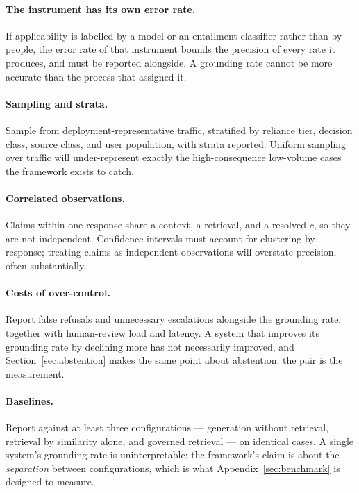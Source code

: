 \paragraph{The instrument has its own error rate.} If applicability is labelled by a
model or an entailment classifier rather than by people, the error rate of that
instrument bounds the precision of every rate it produces, and must be reported
alongside. A grounding rate cannot be more accurate than the process that assigned it.

\paragraph{Sampling and strata.} Sample from deployment-representative traffic, stratified
by reliance tier, decision class, source class, and user population, with strata
reported. Uniform sampling over traffic will under-represent exactly the
high-consequence low-volume cases the framework exists to catch.

\paragraph{Correlated observations.} Claims within one response share a context, a
retrieval, and a resolved $c$, so they are not independent. Confidence intervals must
account for clustering by response; treating claims as independent observations will
overstate precision, often substantially.

\paragraph{Costs of over-control.} Report false refusals and unnecessary escalations
alongside the grounding rate, together with human-review load and latency. A system that
improves its grounding rate by declining more has not necessarily improved, and
Section~\ref{sec:abstention} makes the same point about abstention: the pair is the
measurement.

\paragraph{Baselines.} Report against at least three configurations --- generation
without retrieval, retrieval by similarity alone, and governed retrieval --- on identical
cases. A single system's grounding rate is uninterpretable; the framework's claim is
about the \emph{separation} between configurations, which is what
Appendix~\ref{sec:benchmark} is designed to measure.

